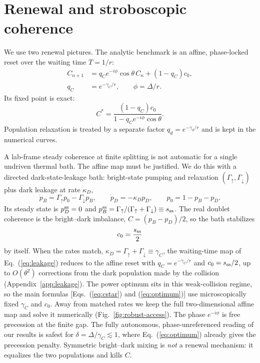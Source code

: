 \documentclass[aps,pre,twocolumn,groupedaddress,amsmath,amssymb,nofootinbib]{revtex4-2}
\begin{document}
\section{Renewal and stroboscopic coherence}

We use two renewal pictures. The analytic benchmark is an affine,
phase-locked reset over the waiting time $T=1/r$:
\begin{align}
C_{n+1}&=q_C e^{-i\phi}\cos\theta\,C_n+(1-q_C)c_0,\nonumber\\
q_C&=e^{-\gamma_C/r},\qquad \phi=\Delta/r .
\end{align}
Its fixed point is exact:
\begin{equation}
C^*=\frac{(1-q_C)c_0}
 {1-q_C e^{-i\phi}\cos\theta}.
\label{eq:cstar}
\end{equation}
Population relaxation is treated by a separate factor
$q_d=e^{-\gamma_d/r}$ and is kept in the numerical curves.

A lab-frame steady coherence at finite splitting is not automatic for a
single undriven thermal bath. The affine map must be justified. We do this
with a directed dark-state-leakage bath: bright-state pumping and relaxation
$(\Gamma_\uparrow,\Gamma_\downarrow)$ plus dark leakage at rate $\kappa_D$,
\begin{equation}
\dot p_B=\Gamma_\uparrow p_0-\Gamma_\downarrow p_B,\qquad
\dot p_D=-\kappa_D p_D,\qquad p_0=1-p_B-p_D.
\label{eq:leakage}
\end{equation}
Its steady state is $p_D^{\rm ss}=0$ and
$p_B^{\rm ss}=\Gamma_\uparrow/(\Gamma_\uparrow+\Gamma_\downarrow)\equiv
s_{\rm ss}$. The real doublet coherence is the bright--dark imbalance,
$C=(p_B-p_D)/2$, so the bath stabilizes
\begin{equation}
c_0=\frac{s_{\rm ss}}{2}
\end{equation}
by itself. When the rates match,
$\kappa_D=\Gamma_\uparrow+\Gamma_\downarrow\equiv\gamma_C$, the waiting-time
map of Eq.~(\ref{eq:leakage}) reduces to the affine reset with
$q_C=e^{-\gamma_C/r}$ and $c_0=s_{\rm ss}/2$, up to $O(\theta^2)$
corrections from the dark population made by the collision
(Appendix~\ref{app:leakage}). The power optimum sits in this weak-collision
regime, so the main formulas
[Eqs.~(\ref{eq:cstar}) and (\ref{eq:optimum})] use microscopically fixed
$\gamma_C$ and $c_0$. Away from matched rates we keep the full
two-dimensional affine map and solve it numerically
(Fig.~\ref{fig:robust-access}). The phase $e^{-i\phi}$ is free precession at
the finite gap. The fully autonomous, phase-unreferenced reading of our
results is safest for $\delta=\Delta/\gamma_C\lesssim 1$, where
Eq.~(\ref{eq:optimum}) already gives the precession penalty. Symmetric
bright--dark mixing is \emph{not} a renewal mechanism: it equalizes the two
populations and kills $C$.
\end{document}
